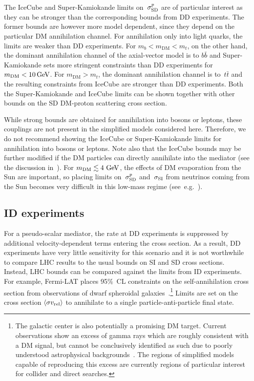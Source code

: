 The IceCube and Super-Kamiokande limits on~$\sigma^p_{\rm{SD}}$ are of particular interest as they can be stronger than the corresponding bounds from DD experiments.  The former bounds are however more model dependent, since they depend on the particular DM annihilation channel.  For annihilation only into light quarks, the limits are weaker than DD experiments. For $m_b< m_\text{DM} < m_t$, on the other hand, the dominant annihilation channel of the axial-vector model is to $b \bar{b}$ and Super-Kamiokande sets more stringent constraints than DD experiments for $m_{\rm{DM}}<10 \, \rm{GeV}$. For $m_\text{DM} > m_t$, the dominant annihilation channel is to~$t \bar{t}$ and the resulting constraints from IceCube are stronger than DD experiments. Both the Super-Kamiokande and IceCube limits can be shown together with other bounds on the SD DM-proton scattering cross section.  

While strong bounds are obtained for annihilation into bosons or leptons, these couplings are not present in the simplified models considered here. Therefore, we do not recommend showing the IceCube or Super-Kamiokande limits for annihilation into bosons or leptons. Note also that the IceCube bounds may be further modified if the DM particles can directly annihilate into the mediator (see the discussion in~\cite{Heisig:2015ira}). For $m_{\rm{DM}}\lesssim4~\mathrm{GeV}$, the effects of DM evaporation from the Sun are important, so placing
limits on~$\sigma^p_{\rm{SD}}$ and~$\sigma_{\rm{SI}}$ from neutrinos coming from the Sun becomes very difficult in this low-mass regime 
(see~e.g.~\cite{Busoni:2013kaa}).


\subsection{ID experiments}
\label{sec:indirect}


For a  pseudo-scalar mediator, the rate at DD experiments is suppressed by additional velocity-dependent terms entering the  cross section. As a result,  DD experiments have very little sensitivity for this scenario and it is not worthwhile to compare  LHC results to the usual bounds on SI and SD  cross sections. Instead,  LHC bounds  can be compared against the limits from  ID experiments. 
For example, Fermi-LAT places 95\%~CL constraints on the self-annihilation  cross section from observations of dwarf spheroidal galaxies~\cite{Ackermann:2015zua}.\footnote{The galactic center is also potentially a promising DM target.  Current observations show an excess of gamma rays which are roughly consistent with a DM signal, but cannot be conclusively identified as such due to poorly understood astrophysical
backgrounds~\cite{TheFermi-LAT:2015kwa}.  The regions of simplified models capable of reproducing this excess are currently regions of particular interest
for collider and direct searches.} Limits are set on the  cross section $\langle \sigma v_{\rm{rel}} \rangle$ to annihilate to a single  particle-anti-particle final state. 

